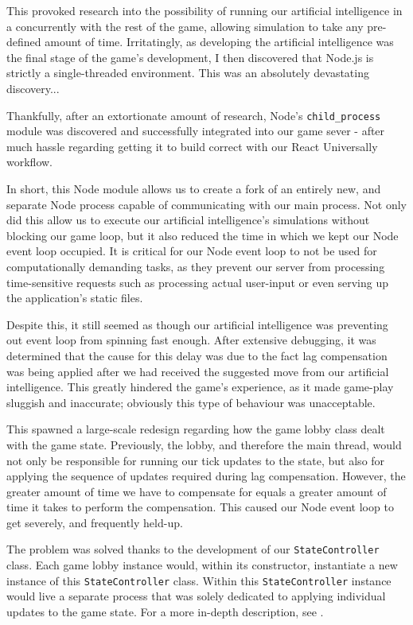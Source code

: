 \documentclass{standalone}
\begin{document}
			This provoked research into the possibility of running our artificial intelligence in a concurrently with the rest of the game, allowing simulation to take any pre-defined amount of time. Irritatingly, as developing the artificial intelligence was the final stage of the game's development, I then discovered that Node.js is strictly a single-threaded environment. This was an absolutely devastating discovery...

			Thankfully, after an extortionate amount of research, Node's \texttt{child\_process} module \parencite{nodeChildProcess} was discovered and successfully integrated into our game sever - after much hassle regarding getting it to build correct with our React Universally workflow.

			In short, this Node module allows us to create a fork of an entirely new, and separate Node process capable of communicating with our main process. Not only did this allow us to execute our artificial intelligence's simulations without blocking our game loop, but it also reduced the time in which we kept our Node event loop occupied. It is critical for our Node event loop to not be used for computationally demanding tasks, as they prevent our server from processing time-sensitive requests such as processing actual user-input or even serving up the application's static files.

			Despite this, it still seemed as though our artificial intelligence was preventing out event loop from spinning fast enough. After extensive debugging, it was determined that the cause for this delay was due to the fact lag compensation was being applied after we had received the suggested move from our artificial intelligence. This greatly hindered the game's experience, as it made game-play sluggish and inaccurate; obviously this type of behaviour was unacceptable.

			This spawned a large-scale redesign regarding how the game lobby class dealt with the game state. Previously, the lobby, and therefore the main thread, would not only be responsible for running our tick updates to the state, but also for applying the sequence of updates required during lag compensation. However, the greater amount of time we have to compensate for equals a greater amount of time it takes to perform the compensation. This caused our Node event loop to get severely, and frequently held-up.

			The problem was solved thanks to the development of our \texttt{StateController} class. Each game lobby instance would, within its constructor, instantiate a new instance of this \texttt{StateController} class. Within this \texttt{StateController} instance would live a separate process that was solely dedicated to applying individual updates to the game state. For a more in-depth description, see .
\end{document}
